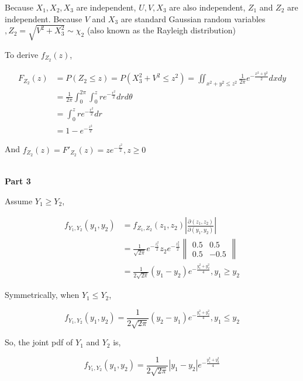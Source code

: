 \documentclass{article}
\begin{document}
Because $X_1,X_2,X_3$ are independent, $U,V,X_3$ are also independent, $Z_1$ and $Z_2$ are independent. Because $V$ and $X_3$ are standard Gaussian random variables $,Z_2 = \sqrt{V^2+X_3^2} \sim \chi_{2}$ (also known as the Rayleigh distribution)

To derive $f_{Z_2}(z)$,

\begin{equation}
    \begin{aligned}
        F_{Z_2}(z) & = P(Z_2\leqslant z)  = P(X_3^2+V^2\leqslant z^2) = \iint_{x^2+y^2\leqslant z^2 } \frac{1}{2\pi} e^{-\frac{x^2+y^2}{2}} dxdy 
        \\ & = \frac 1{2\pi} \int_{0}^{2\pi} \int_{0}^{z} re^{-\frac{r^2}{2}} drd\theta \\
        & = \int_{0}^{z} re^{-\frac{r^2}{2}} dr \\
        & = 1- e^{-\frac {z^2}{2}}
    \end{aligned}
\end{equation}

And $f_{Z_2}(z) = F'_{Z_2}(z) = z e^{-\frac {z^2}{2}}, z\geqslant 0$

~\\

\textbf{Part 3}

Assume $Y_1 \geqslant Y_2$, 

\begin{equation}
    \begin{aligned}
        f_{Y_1,Y_2}(y_1, y_2) & =f_{Z_1,Z_2}(z_1, z_2)\left|\frac{\partial(z_1, z_2)}{\partial(y_1, y_2)}\right| \\
        & = \frac {1}{\sqrt{2\pi}} e^{-\frac{z_1^2}{2}} z_2 e^{-\frac {z_2^2}{2}}\left\|\begin{matrix}
            0.5  & 0.5 \\ 
            0.5 &  -0.5
        \end{matrix}\right\| \\
        & = \frac{1}{2\sqrt{2\pi}} (y_1-y_2) e^{-\frac{y_1^2+y_2^2}{4}}, y_1\geqslant y_2
    \end{aligned}
\end{equation}

Symmetrically, when $Y_1 \leqslant Y_2$,

\begin{equation}
    f_{Y_1,Y_2}(y_1, y_2) = \frac{1}{2\sqrt{2\pi}} (y_2-y_1) e^{-\frac{y_1^2+y_2^2}{4}}, y_1\leqslant y_2
\end{equation}


So, the joint pdf of $Y_1$ and $Y_2$ is,

\begin{equation}
    f_{Y_1,Y_2}(y_1, y_2) = \frac{1}{2\sqrt{2\pi}} \left|y_1-y_2\right| e^{-\frac{y_1^2+y_2^2}{4}}
\end{equation}
\end{document}
